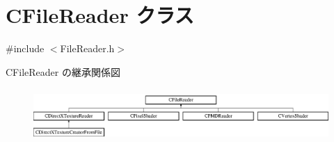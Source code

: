 \hypertarget{class_c_file_reader}{}\section{C\+File\+Reader クラス}
\label{class_c_file_reader}


{\ttfamily \#include $<$File\+Reader.\+h$>$}

C\+File\+Reader の継承関係図\begin{figure}[H]
\begin{center}
\leavevmode
\includegraphics[height=2.028986cm]{class_c_file_reader}
\end{center}
\end{figure}
